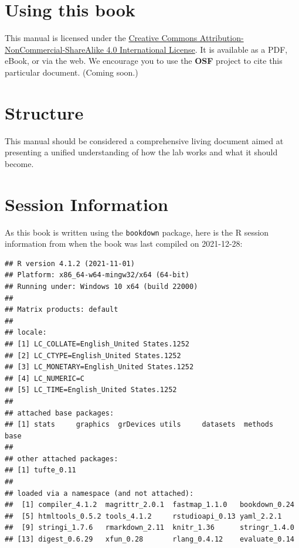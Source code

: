 \documentclass[]{tufte-book}
\begin{document}
\hypertarget{using-this-book}{%
\section*{Using this book}\label{using-this-book}}

This manual is licensed under the \href{http://creativecommons.org/licenses/by-nc-sa/4.0/}{Creative Commons Attribution-NonCommercial-ShareAlike 4.0 International License}. It is available as a PDF, eBook, or via the web. We encourage you to use the \textbf{OSF} project to cite this particular document. (Coming soon.)

\hypertarget{structure}{%
\section*{Structure}\label{structure}}

This manual should be considered a comprehensive living document aimed at presenting a unified understanding of how the lab works and what it should become.

\hypertarget{session-information}{%
\section*{Session Information}\label{session-information}}

As this book is written using the \texttt{bookdown} package, here is the R session information from when the book was last compiled on 2021-12-28:

\begin{verbatim}
## R version 4.1.2 (2021-11-01)
## Platform: x86_64-w64-mingw32/x64 (64-bit)
## Running under: Windows 10 x64 (build 22000)
## 
## Matrix products: default
## 
## locale:
## [1] LC_COLLATE=English_United States.1252 
## [2] LC_CTYPE=English_United States.1252   
## [3] LC_MONETARY=English_United States.1252
## [4] LC_NUMERIC=C                          
## [5] LC_TIME=English_United States.1252    
## 
## attached base packages:
## [1] stats     graphics  grDevices utils     datasets  methods   base     
## 
## other attached packages:
## [1] tufte_0.11
## 
## loaded via a namespace (and not attached):
##  [1] compiler_4.1.2  magrittr_2.0.1  fastmap_1.1.0   bookdown_0.24  
##  [5] htmltools_0.5.2 tools_4.1.2     rstudioapi_0.13 yaml_2.2.1     
##  [9] stringi_1.7.6   rmarkdown_2.11  knitr_1.36      stringr_1.4.0  
## [13] digest_0.6.29   xfun_0.28       rlang_0.4.12    evaluate_0.14
\end{verbatim}
\end{document}
